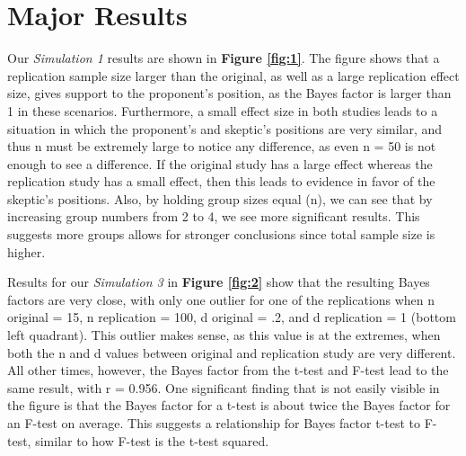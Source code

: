 \documentclass[11pt]{article}
\begin{document}
\section{Major Results}
Our \textit{Simulation 1} results are shown in \textbf{Figure \ref{fig:1}}. The figure shows that a replication sample size larger than the original, as well as a large replication effect size, gives support to the proponent’s position, as the Bayes factor is larger than 1 in these scenarios. Furthermore, a small effect size in both studies leads to a situation in which the proponent’s and skeptic’s positions are very similar, and thus n must be extremely large to notice any difference, as even n = 50 is not enough to see a difference. If the original study has a large effect whereas the replication study has a small effect, then this leads to evidence in favor of the skeptic’s positions. Also, by holding group sizes equal (n), we can see that by increasing group numbers from 2 to 4, we see more significant results. This suggests more groups allows for stronger conclusions since total sample size is higher. 

Results for our \textit{Simulation 3} in \textbf{Figure \ref{fig:2}} show that the resulting Bayes factors are  very close, with only one outlier for one of the replications when n original = 15, n replication = 100, d original = .2, and d replication = 1 (bottom left quadrant). This outlier makes sense, as this value is at the extremes, when both the n and d values between original and replication study are very different. All other times, however, the Bayes factor from the t-test and F-test lead to the same result, with r = 0.956. One significant finding that is not easily visible in the figure is that the Bayes factor for a t-test is about twice the Bayes factor for an F-test on average. This suggests a relationship for Bayes factor t-test to F-test, similar to how F-test is the t-test squared.
\end{document}
